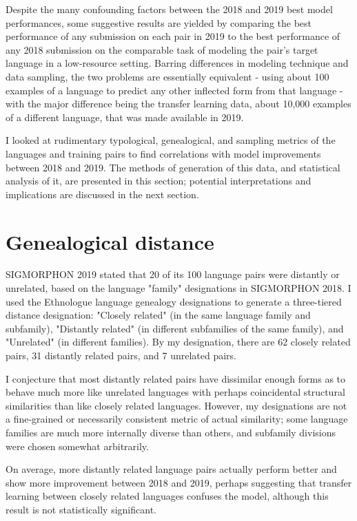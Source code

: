 Despite the many confounding factors between the 2018 and 2019 best model performances, some suggestive results are yielded by comparing the best performance of any submission on each pair in 2019 to the best performance of any 2018 submission on the comparable task of modeling the pair's target language in a low-resource setting. Barring differences in modeling technique and data sampling, the two problems are essentially equivalent - using about 100 examples of a language to predict any other inflected form from that language - with the major difference being the transfer learning data, about 10,000 examples of a different language, that was made available in 2019. 

I looked at rudimentary typological, genealogical, and sampling metrics of the languages and training pairs to find correlations with model improvements between 2018 and 2019. The methods of generation of this data, and statistical analysis of it, are presented in this section; potential interpretations and implications are discussed in the next section.

\section{Genealogical distance}

SIGMORPHON 2019 stated that 20 of its 100 language pairs were distantly or unrelated, based on the language "family" designations in SIGMORPHON 2018. I used the Ethnologue language genealogy designations to generate a three-tiered distance designation: "Closely related" (in the same language family and subfamily), "Distantly related" (in different subfamilies of the same family), and "Unrelated" (in different families). By my designation, there are 62 closely related pairs, 31 distantly related pairs, and 7 unrelated pairs.

I conjecture that most distantly related pairs have dissimilar enough forms as to behave much more like unrelated languages with perhaps coincidental structural similarities than like closely related languages. However, my designations are not a fine-grained or necessarily consistent metric of actual similarity; some language families are much more internally diverse than others, and subfamily divisions were chosen somewhat arbitrarily. 

On average, more distantly related language pairs actually perform better and show more improvement between 2018 and 2019, perhaps suggesting that transfer learning between closely related languages confuses the model, although this result is not statistically significant.

